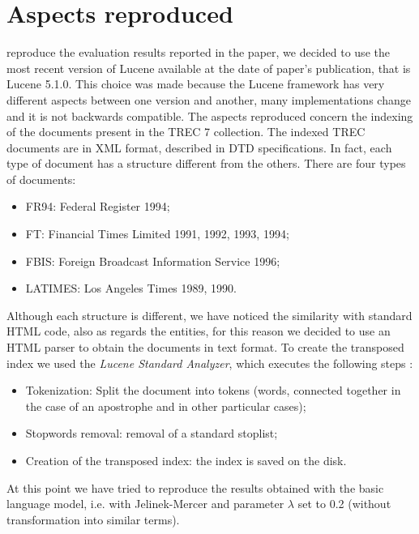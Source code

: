 \section{Aspects reproduced}\label{sec:reproduction}
 reproduce the evaluation results reported in the paper, we decided to use the most recent version of Lucene available at the date of paper's publication, that is Lucene 5.1.0.
This choice was made because the Lucene framework has very different aspects between one version and another, many implementations change and it is not backwards compatible.
The aspects reproduced concern the indexing of the documents present in the TREC 7 collection.
The indexed TREC documents are in XML format, described in DTD specifications. In fact, each type of document has a structure different from the others.
There are four types of documents:
\begin{itemize}
    \item FR94: Federal Register 1994;
    \item FT: Financial Times Limited 1991, 1992, 1993, 1994;
    \item FBIS: Foreign Broadcast Information Service 1996;
    \item LATIMES: Los Angeles Times 1989, 1990.
\end{itemize}

\pagebreak

Although each structure is different, we have noticed the similarity with standard HTML code, also as regards the entities, for this reason we decided to use an HTML parser to obtain the documents in text format.
To create the transposed index we used the \textit{Lucene Standard Analyzer}, which executes the following steps \cite{slides:agosti}:
\begin{itemize}
    \item Tokenization: Split the document into tokens (words, connected together in the case of an apostrophe and in other particular cases);
    \item Stopwords removal: removal of a standard stoplist;
    \item Creation of the transposed index: the index is saved on the disk.
\end{itemize}

At this point we have tried to reproduce the results obtained with the basic language model, i.e. with Jelinek-Mercer and parameter \(\lambda\) set to 0.2 (without transformation into similar terms).

